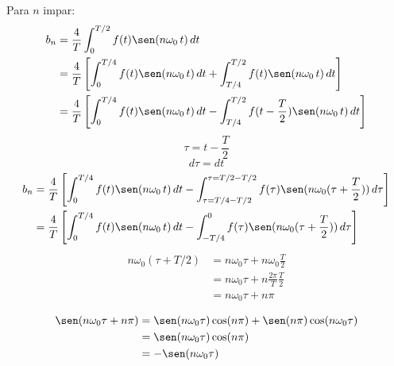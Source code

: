 Para $n$ impar:
\begin{equation*}
\begin{split}
    b_n
        &=\frac{4}{T}\int_0^{T/2}f(t)\sen(n\omega_0\,t)\,dt\\
        &=\frac{4}{T}\left[
            \int_0^{T/4}f(t)\sen(n\omega_0\,t)\,dt+
            \int_{T/4}^{T/2}f(t)\sen(n\omega_0\,t)\,dt
        \right]\\
        &=\frac{4}{T}\left[
            \int_0^{T/4}f(t)\sen(n\omega_0\,t)\,dt-
            \int_{T/4}^{T/2}f(t-\frac{T}{2})\sen(n\omega_0\,t)\,dt
        \right]\\
\end{split}
\end{equation*}
\begin{equation*}
    \tau=t-\frac{T}{2}
\end{equation*}
\begin{equation*}
    d\tau=dt
\end{equation*}
\begin{equation*}
\begin{split}
    b_n
        &=\frac{4}{T}\left[
            \int_0^{T/4}f(t)\sen(n\omega_0\,t)\,dt-
            \int_{\tau=T/4-T/2}^{\tau=T/2-T/2}
                f(\tau)\sen(n\omega_0(\tau+\frac{T}{2}))\,d\tau
        \right]\\
        &=\frac{4}{T}\left[
            \int_0^{T/4}f(t)\sen(n\omega_0\,t)\,dt-
            \int_{-T/4}^{0}
                f(\tau)\sen(n\omega_0(\tau+\frac{T}{2}))\,d\tau
        \right]\\
\end{split}
\end{equation*}
\begin{equation*}
\begin{split}
    n\omega_0(\tau+T/2)
        &=n\omega_0\tau+n\omega_0\frac{T}{2}\\
        &=n\omega_0\tau+n\frac{2\pi}{T}\frac{T}{2}\\
        &=n\omega_0\tau+n\pi\\
\end{split}
\end{equation*}
\begin{equation*}
\begin{split}
    \sen(n\omega_0\tau+n\pi)
        &=\sen(n\omega_0\tau)\cos(n\pi)+\sen(n\pi)\cos(n\omega_0\tau)\\
        &=\sen(n\omega_0\tau)\cos(n\pi)\\
        &=-\sen(n\omega_0\tau)\\
\end{split}
\end{equation*}
